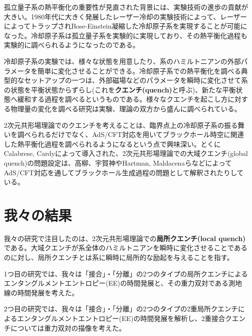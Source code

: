 孤立量子系の熱平衡化の重要性が見直された背景には、実験技術の進歩の貢献が大きい。1980年代に大きく発展したレーザー冷却\cite{Phillips1998}\cite{Metcalf2007}の実験技術によって、レーザーによってトラップされBose-Einstein凝縮した冷却原子系を実現することが可能になった。冷却原子系は孤立量子系を実験的に実現しており、その熱平衡化過程も実験的に調べられるようになったのである。

冷却原子系の実験では、様々な状態を用意したり、系のハミルトニアンの外部パラメータを簡単に変化させることができる。冷却原子系での熱平衡化を調べる典型的なセットアップの一つは、外部磁場などのパラメータを瞬時に変化させて系の状態を平衡状態からずらし(これを\textbf{クエンチ(quench)}と呼ぶ)、新たな平衡状態へ緩和する過程を調べるというものである。様々なクエンチを起こし方に対する物理量の変化を調べる研究は実験\cite{greiner2002collapse}\cite{kinoshita2006quantum}\cite{hofferberth2007non}\cite{trotzky2012probing}\cite{cheneau2012light}\cite{gring2012relaxation}、理論\cite{essler2016quench}\cite{Calabrese2006}\cite{fagotti2013}\cite{manmana2007}の双方から盛んに調べられている。

2次元共形場理論でのクエンチを考えることは、臨界点上の冷却原子系の振る舞いを調べられるだけでなく、AdS/CFT対応を用いてブラックホール時空に関連した熱平衡化過程を調べられるようになるという点で興味深い。とくにCalabrese, Cardyによって導入された、2次元共形場理論での大域クエンチ(global quench)\cite{Calabrese:2007rg}の問題設定は、高柳、宇賀神\cite{Takayanagi:2010wp}やHartman, Maldacena\cite{hartman2013time}らなどによってAdS/CFT対応を通してブラックホール生成過程の問題として解釈されたりしている。

\section*{我々の結果}
我々の研究\cite{Shimaji:2018czt}\cite{Caputa:2019avh}で注目したのは、2次元共形場理論での\textbf{局所クエンチ(local quench)}である。大域クエンチが系全体のハミルトニアンを瞬時に変化させることであるのに対し、局所クエンチとは系に瞬時に局所的な励起を与えることを指す。

1つ目の研究\cite{Shimaji:2018czt}では、我々は「接合」・「分離」の2つのタイプの局所クエンチによるエンタングルメントエントロピー(EE)の時間発展と、その重力双対である測地線の時間発展を考えた。

2つ目の研究\cite{Caputa:2019avh}では、我々は「接合」・「分離」の2つのタイプの2重局所クエンチによるエンタングルメントエントロピー(EE)の時間発展を解析し、2重接合クエンチについては重力双対の描像を考えた。

